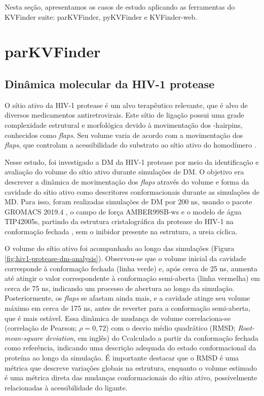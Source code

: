 \documentclass[Portugues]{phdquali}
\begin{document}
Nesta seção, apresentamos os casos de estudo aplicando as ferramentas do KVFinder suite: parKVFinder, pyKVFinder e KVFinder-web.

\section{parKVFinder \label{ap:casos-de-estudo-parkvfinder}}

\subsection{Dinâmica molecular da HIV-1 protease \label{sec:md-hiv1-protease}}

O sítio ativo da HIV-1 protease é um alvo terapêutico relevante, que é alvo de diversos medicamentos antiretrovirais. Este sítio de ligação possui uma grade complexidade estrutural e morfológica devido à movimentação dos \textbeta-hairpins, conhecidos como \textit{flaps}. Seu volume varia de acordo com a movimentação dos \textit{flaps}, que controlam a acessibilidade do substrato ao sítio ativo do homodímero \cite{lam1994,soares2016}. 

Nesse estudo, foi investigado a DM da HIV-1 protease por meio da identificação e avaliação do volume do sítio ativo durante simulações de DM. O objetivo era descrever a dinâmica de movimentação dos \textit{flaps} através do volume e forma da cavidade do sítio ativo como descritores conformacionais durante as simulações de MD. Para isso, foram realizadas simulações de DM por 200 ns, usando o pacote GROMACS 2019.4 \cite{gromacs}, o campo de força AMBER99SB-ws e o modelo de água TIP42005s, partindo da estrutura cristalográfica da protease do HIV-1 na conformação fechada \cite{lam1994}, sem o inibidor presente na estrutura, a ureia cíclica.

O volume do sítio ativo foi acompanhado ao longo das simulações (Figura \ref{fig:hiv1-protease-dm-analysis}). Observou-se que o volume inicial da cavidade corresponde à conformação fechada (linha verde) e, após cerca de 25 ns, aumenta até atingir o valor correspondente à conformação semi-aberta (linha vermelha) em cerca de 75 ns, indicando um processo de abertura ao longo da simulação. Posteriormente, os \textit{flaps} se afastam ainda mais, e a cavidade atinge seu volume máximo em cerca de 175 ns, antes de reverter para a conformação semi-aberta, que é mais estável. Essa dinâmica de mudança de volume correlaciona-se (correlação de Pearson; $\rho = 0,72$) com o desvio médio quadrático (RMSD; \textit{Root-mean-square deviation}, em inglês) do C\textalpha\space calculado a partir da conformação fechada como referência, indicando uma descrição adequada do estado conformacional da proteína ao longo da simulação. É importante destacar que o RMSD é uma métrica que descreve variações globais na estrutura, enquanto o volume estimado é uma métrica direta das mudanças conformacionais do sítio ativo, possivelmente relacionadas à acessibilidade do ligante.
\end{document}
